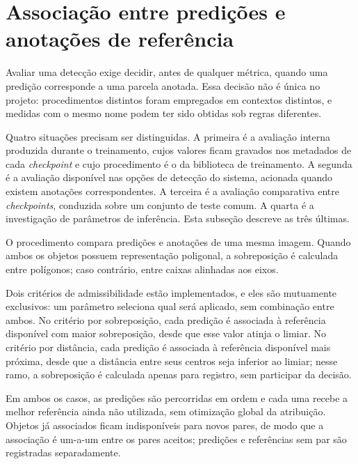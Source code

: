 \section{Associa\c{c}\~ao entre predi\c{c}\~oes e anota\c{c}\~oes de refer\^encia}
\label{sec:associacao-prediccoes-anotacoes}

Avaliar uma detec\c{c}\~ao exige decidir, antes de qualquer m\'etrica, quando uma predi\c{c}\~ao corresponde a uma parcela anotada. Essa decis\~ao n\~ao \'e \'unica no projeto: procedimentos distintos foram empregados em contextos distintos, e medidas com o mesmo nome podem ter sido obtidas sob regras diferentes.

Quatro situa\c{c}\~oes precisam ser distinguidas. A primeira \'e a avalia\c{c}\~ao interna produzida durante o treinamento, cujos valores ficam gravados nos metadados de cada \textit{checkpoint} e cujo procedimento \'e o da biblioteca de treinamento. A segunda \'e a avalia\c{c}\~ao dispon\'ivel nas op\c{c}\~oes de detec\c{c}\~ao do sistema, acionada quando existem anota\c{c}\~oes correspondentes. A terceira \'e a avalia\c{c}\~ao comparativa entre \textit{checkpoints}, conduzida sobre um conjunto de teste comum. A quarta \'e a investiga\c{c}\~ao de par\^ametros de infer\^encia. Esta subse\c{c}\~ao descreve as tr\^es \'ultimas.

O procedimento compara predi\c{c}\~oes e anota\c{c}\~oes de uma mesma imagem. Quando ambos os objetos possuem representa\c{c}\~ao poligonal, a sobreposi\c{c}\~ao \'e calculada entre pol\'igonos; caso contr\'ario, entre caixas alinhadas aos eixos.

Dois crit\'erios de admissibilidade est\~ao implementados, e eles s\~ao mutuamente exclusivos: um par\^ametro seleciona qual ser\'a aplicado, sem combina\c{c}\~ao entre ambos. No crit\'erio por sobreposi\c{c}\~ao, cada predi\c{c}\~ao \'e associada \`a refer\^encia dispon\'ivel com maior sobreposi\c{c}\~ao, desde que esse valor atinja o limiar. No crit\'erio por dist\^ancia, cada predi\c{c}\~ao \'e associada \`a refer\^encia dispon\'ivel mais pr\'oxima, desde que a dist\^ancia entre seus centros seja inferior ao limiar; nesse ramo, a sobreposi\c{c}\~ao \'e calculada apenas para registro, sem participar da decis\~ao.

Em ambos os casos, as predi\c{c}\~oes s\~ao percorridas em ordem e cada uma recebe a melhor refer\^encia ainda n\~ao utilizada, sem otimiza\c{c}\~ao global da atribui\c{c}\~ao. Objetos j\'a associados ficam indispon\'iveis para novos pares, de modo que a associa\c{c}\~ao \'e um-a-um entre os pares aceitos; predi\c{c}\~oes e refer\^encias sem par s\~ao registradas separadamente.

